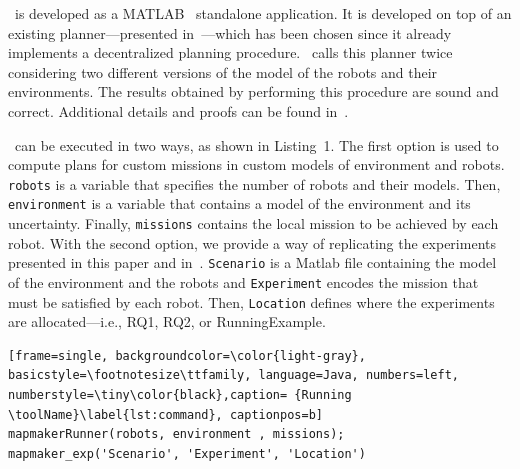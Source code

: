 
\toolName\ is developed as a  MATLAB~\cite{matlab} standalone application.
It is developed on top of an existing planner---presented in~\cite{tumova2016multi}---which has been chosen since it already implements a decentralized planning procedure.
\toolName\ calls this planner twice considering two different versions of the model of the robots and their environments. 
The results obtained by performing this procedure are sound and correct.
Additional details and proofs can be found in~\cite{menghi2018multi}.


\toolName\ can be executed in two ways, as shown in Listing~1. %
The first option is used to compute plans for custom missions in custom models of environment and robots.
\texttt{robots} is a variable that specifies the number of robots and their models.
Then, \texttt{environment} is a variable that contains a model of the environment and its uncertainty.
Finally, \texttt{missions} contains the local mission to be achieved by each robot.
With the second option, we provide a way of replicating the experiments presented in this paper and in~\cite{menghi2018multi}.
\texttt{Scenario} is a Matlab file containing the model of the environment and the robots and \texttt{Experiment} encodes the mission that must be satisfied by each robot.
Then, \texttt{Location} defines where the experiments are allocated---i.e., RQ1, RQ2, or RunningExample.



\begin{lstlisting}[frame=single, backgroundcolor=\color{light-gray}, basicstyle=\footnotesize\ttfamily, language=Java, numbers=left, numberstyle=\tiny\color{black},caption= {Running \toolName}\label{lst:command}, captionpos=b]
mapmakerRunner(robots, environment , missions);
mapmaker_exp('Scenario', 'Experiment', 'Location')
\end{lstlisting}




